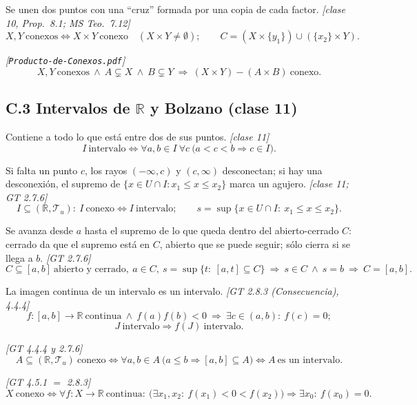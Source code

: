 \documentclass[11pt,a4paper]{article}
\theoremstyle{definition}
\theoremstyle{plain}
\newcommand{\fnt}[1]{{\normalfont\small\itshape\color{gray!150!black}[#1]}}
\newcommand{\R}{\mathbb{R}}
\newcommand{\tp}{\mathcal{T}}
\begin{document}
\begin{itemize}[leftmargin=1.3em,itemsep=3pt]
 Se unen dos puntos con una ``cruz'' formada por una copia de cada factor. \fnt{clase 10, Prop.\ 8.1; MS Teo.\ 7.12}
\[ X,Y\ \text{conexos}\iff X\times Y\ \text{conexo}\quad(X\times Y\ne\emptyset);\qquad C=(X\times\{y_1\})\cup(\{x_2\}\times Y). \]

 \fnt{\texttt{Producto-de-Conexos.pdf}}
\[ X,Y\ \text{conexos}\ \wedge\ A\subsetneq X\ \wedge\ B\subsetneq Y\ \Rightarrow\ (X\times Y)-(A\times B)\ \text{conexo}. \]

\end{itemize}

\subsection*{C.3 Intervalos de $\R$ y Bolzano \normalfont\small (clase 11)}

\begin{itemize}[leftmargin=1.3em,itemsep=3pt]

 Contiene a todo lo que está entre dos de sus puntos. \fnt{clase 11}
\[ I\ \text{intervalo}\iff \forall a,b\in I\ \forall c\ \big(a<c<b\Rightarrow c\in I\big). \]

 Si falta un punto $c$, los rayos $(-\infty,c)$ y $(c,\infty)$ desconectan; si hay una desconexión, el supremo de $\{x\in U\cap I: x_1\le x\le x_2\}$ marca un agujero. \fnt{clase 11; GT 2.7.6}
\[ I\subseteq(\R,\tp_u):\ I\ \text{conexo}\iff I\ \text{intervalo};\qquad s=\sup\{x\in U\cap I:\ x_1\le x\le x_2\}. \]

 Se avanza desde $a$ hasta el supremo de lo que queda dentro del abierto-cerrado $C$: cerrado da que el supremo está en $C$, abierto que se puede seguir; sólo cierra si se llega a $b$. \fnt{GT 2.7.6}
\[ C\subseteq[a,b]\ \text{abierto y cerrado},\ a\in C,\ s=\sup\{t:\ [a,t]\subseteq C\}\ \Rightarrow\ s\in C\ \wedge\ s=b\ \Rightarrow\ C=[a,b]. \]

 La imagen continua de un intervalo es un intervalo. \fnt{GT 2.8.3 (Consecuencia), 4.4.4}
\[ f:[a,b]\to\R\ \text{continua}\ \wedge\ f(a)f(b)<0\ \Rightarrow\ \exists c\in(a,b):\ f(c)=0; \]
\[ J\ \text{intervalo}\Rightarrow f(J)\ \text{intervalo}. \]

 \fnt{GT 4.4.4 y 2.7.6}
\[ A\subseteq(\R,\tp_u)\ \text{conexo}\iff \forall a,b\in A\ \big(a\le b\Rightarrow[a,b]\subseteq A\big)\iff A\ \text{es un intervalo}. \]

 \fnt{GT 4.5.1 $=$ 2.8.3}
\[ X\ \text{conexo}\iff \forall f:X\to\R\ \text{continua}:\ \big(\exists x_1,x_2:\ f(x_1)<0<f(x_2)\big)\Rightarrow\exists x_0:\ f(x_0)=0. \]

\end{itemize}
\end{document}
